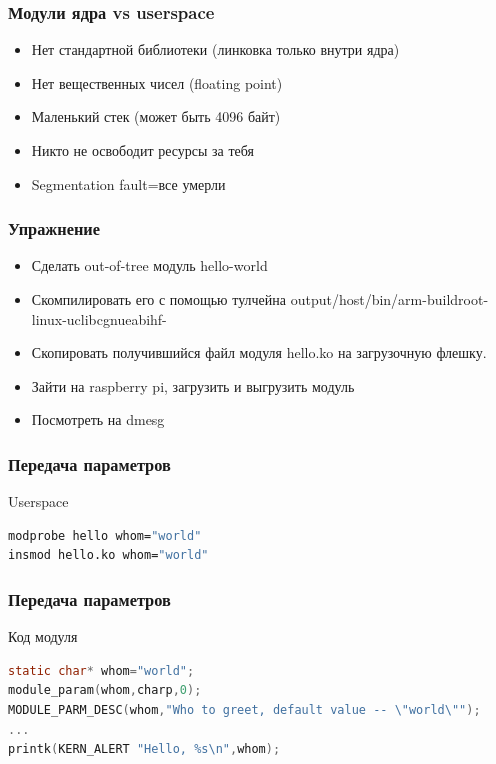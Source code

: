 \begin{frame}
  \frametitle{Модули ядра vs userspace}
  \begin{itemize}
    \item Нет стандартной библиотеки (линковка только внутри ядра)
    \item Нет вещественных чисел (floating point)
    \item Маленький стек (может быть 4096 байт)
    \item Никто не освободит ресурсы за тебя
    \item Segmentation fault=все умерли
  \end{itemize}
\end{frame}

\begin{frame}
  \frametitle{Упражнение}
  \begin{itemize}
      \item Сделать out-of-tree модуль hello-world
      \item Скомпилировать его с помощью тулчейна output/host/bin/arm-buildroot-linux-uclibcgnueabihf-
      \item Скопировать получившийся файл модуля hello.ko на загрузочную флешку.
      \item Зайти на raspberry pi, загрузить и выгрузить модуль
      \item Посмотреть на dmesg
  \end{itemize}
\end{frame}

\begin{frame}[fragile]
  \frametitle{Передача параметров}
\begin{center}
  Userspace
\end{center}
\begin{lstlisting}[language=bash]
modprobe hello whom="world"
insmod hello.ko whom="world"
\end{lstlisting}
\end{frame}

\begin{frame}[fragile]
  \frametitle{Передача параметров}
\begin{center}
  Код модуля 
\end{center}
\begin{lstlisting}[language=C]
static char* whom="world";
module_param(whom,charp,0);
MODULE_PARM_DESC(whom,"Who to greet, default value -- \"world\"");
...
printk(KERN_ALERT "Hello, %s\n",whom);
\end{lstlisting}
\end{frame}

